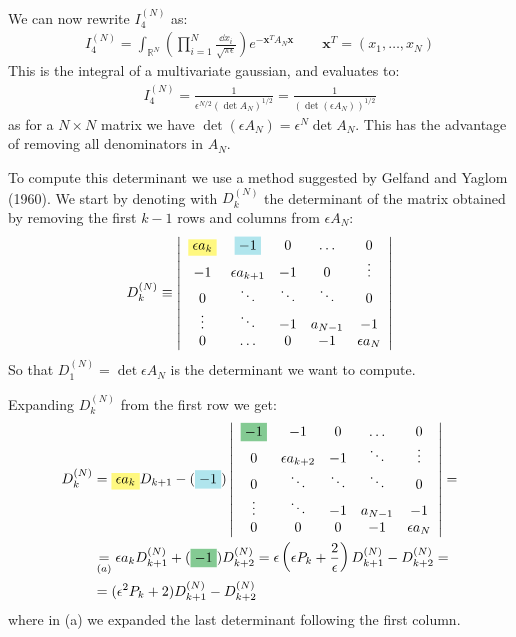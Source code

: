 \documentclass[../template.tex]{subfiles}
\begin{document}
We can now rewrite $I_4^{(N)}$ as:
\begin{align*}
    I_4^{(N)} = \int_{\mathbb{R}^N} \left(\prod_{i=1}^N \frac{\dd{x_i}}{\sqrt{ \pi \epsilon}} \right) e^{-\bm{x}^T A_N \bm{x}} \qquad \bm{x}^T = (x_1,\dots,x_N)
\end{align*} 
This is the integral of a multivariate gaussian, and evaluates to:
\begin{align*}
    I_4^{(N)} = \frac{1}{\epsilon^{N/2} (\operatorname{det} A_N)^{1/2}} = \frac{1}{(\operatorname{det}(\epsilon A_N))^{1/2} }  
\end{align*}
as for a $N \times N$ matrix we have $\operatorname{det}(\epsilon A_N) = \epsilon^N \operatorname{det}A_N$. This has the advantage of removing all denominators in $A_N$.

To compute this determinant we use a method suggested by Gelfand and Yaglom (1960). We start by denoting with $D_k^{(N)}$ the determinant of the matrix obtained by removing the first $k-1$ rows and columns from $\epsilon A_N$:
\begin{align*}
    D_k^{(N)} \equiv \left|\begin{array}{ccccc}
        \hlc{Yellow}{\epsilon a_k} & \hlc{SkyBlue}{-1} & 0 & \dots & 0 \\ 
        -1 & \epsilon a_{k+1} & -1 & 0 & \vdots \\ 
        0 & \ddots & \ddots & \ddots & 0 \\ 
        \vdots & \ddots & -1 & a_{N-1} & -1 \\ 
        0 & \dots & 0 & -1 & \epsilon a_N
        \end{array}\right|
\end{align*}    
So that $D_1^{(N)} = \operatorname{det} \epsilon A_N$ is the determinant we want to compute.


Expanding $D_k^{(N)}$ from the first row we get:
\begin{align*}
    D_k^{(N)} &=\hlc{Yellow}{ \epsilon a_k }D_{k+1} -(\hlc{SkyBlue}{-1}) \left|\begin{array}{ccccc}
    \hlc{ForestGreen}{-1} & -1 & 0 & \dots & 0 \\ 
    0 & \epsilon a_{k+2} & -1 & \ddots & \vdots \\ 
    0 & \ddots & \ddots & \ddots & 0\\
    \vdots & \ddots  & -1 & a_{N-1} & -1\\ 
    0 & 0 & 0 &-1 & \epsilon a_N
    \end{array}\right| =\\
    &\underset{(a)}{=} \epsilon a_k D_{k+1}^{(N)} + (\hlc{ForestGreen}{-1}) D_{k+2}^{(N)} = \epsilon \left(\epsilon P_k + \frac{2}{\epsilon} \right) D_{k+1}^{(N)} - D_{k+2}^{(N)} = \\
    &= (\epsilon^2 P_k + 2) D_{k+1}^{(N)} - D_{k+2}^{(N)}
\end{align*} 
where in (a) we expanded the last determinant following the first column.
\end{document}
